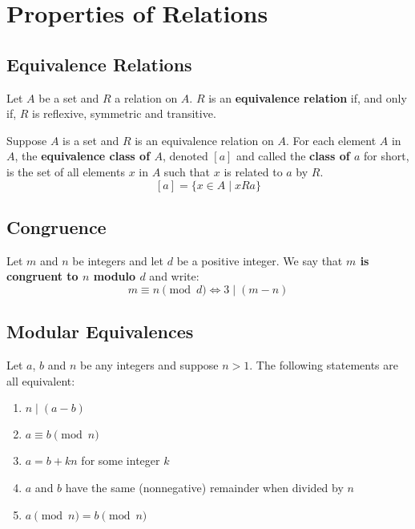 
\section{Properties of Relations}

\subsection{Equivalence Relations}

\begin{definition}
    Let $A$ be a set and $R$ a relation on $A$. $R$ is an \textbf{equivalence relation} if, and only if, $R$ is reflexive, symmetric and transitive.
\end{definition}

\begin{definition}
    Suppose $A$ is a set and $R$ is an equivalence relation on $A$. For each element $A$ in $A$, the \textbf{equivalence class of $A$}, denoted $[a]$ and called the \textbf{class of $a$} for short, is the set of all elements $x$ in $A$ such that $x$ is related to $a$ by $R$.
    $$ [a] = \{x\in A \mid  x R a\} $$
\end{definition}

\subsection{Congruence}

\begin{definition}
    Let $m$ and $n$ be integers and let $d$ be a positive integer. We say that \textbf{$m$ is congruent to $n$ modulo $d$} and write:
    $$ m \equiv n \pmod{d} \iff 3 \mid (m-n) $$
\end{definition}

\subsection{Modular Equivalences}

\begin{theorem}
    Let $a$, $b$ and $n$ be any integers and suppose $n>1$. The following statements are all equivalent:
    \begin{enumerate}
        \item $n\mid (a-b)$
        \item $a \equiv b \pmod{n}$
        \item $a = b + kn$ for some integer $k$
        \item $a$ and $b$ have the same (nonnegative) remainder when divided by $n$
        \item $a \pmod n = b \pmod n$
    \end{enumerate}
\end{theorem}


